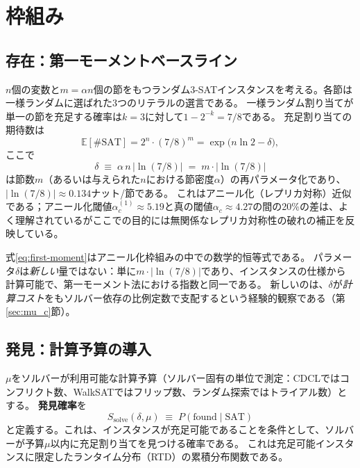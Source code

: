 \documentclass[11pt,a4paper]{article}
\newcommand{\Ssolve}{S_{\text{solve}}}
\newcommand{\PfSAT}{P(\text{found}\mid\text{SAT})}
\begin{document}
\section{枠組み}
\label{sec:framework}

\subsection{存在：第一モーメントベースライン}

$n$個の変数と$m = \alpha n$個の節をもつランダム3-SATインスタンスを考える。各節は一様ランダムに選ばれた3つのリテラルの選言である。
一様ランダム割り当てが単一の節を充足する確率は$k=3$に対して$1 - 2^{-k} = 7/8$である。
充足割り当ての期待数は
\begin{equation}
\label{eq:first-moment}
\mathbb{E}[\#\text{SAT}] = 2^n \cdot (7/8)^m
  = \exp\!\bigl(n\ln 2 - \delta\bigr),
\end{equation}
ここで
\begin{equation}
\label{eq:delta}
\delta \;\equiv\; \alpha\, n\, |\!\ln(7/8)|
  \;=\; m \cdot |\!\ln(7/8)|
\end{equation}
は節数$m$（あるいは与えられた$n$における節密度$\alpha$）の再パラメータ化であり、$|\!\ln(7/8)| \approx 0.134$ナット/節である。
これはアニール化（レプリカ対称）近似である；アニール化閾値$\alpha_c^{(1)} \approx 5.19$と真の閾値$\alpha_c \approx 4.27$\cite{MPZ2009}の間の20\%の差は、よく理解されているがここでの目的には無関係なレプリカ対称性の破れの補正を反映している。

式\eqref{eq:first-moment}はアニール化枠組みの中での数学的恒等式である。
パラメータ$\delta$は\emph{新しい}量ではない：単に$m \cdot |\!\ln(7/8)|$であり、インスタンスの仕様から計算可能で、第一モーメント法における指数と同一である\cite{MPZ2009}。
新しいのは、$\delta$が\emph{計算コスト}をもソルバー依存の比例定数で支配するという経験的観察である（第\ref{sec:mu_c}節）。

\subsection{発見：計算予算の導入}

$\mu$をソルバーが利用可能な計算予算（ソルバー固有の単位で測定：CDCLではコンフリクト数、WalkSATではフリップ数、ランダム探索ではトライアル数）とする。
\textbf{発見確率}を
\begin{equation}
\label{eq:ssolve}
\Ssolve(\delta, \mu) \;\equiv\; \PfSAT
\end{equation}
と定義する。これは、インスタンスが充足可能であることを条件として、ソルバーが予算$\mu$以内に充足割り当てを見つける確率である。
これは充足可能インスタンスに限定したランタイム分布（RTD）\cite{Hoos1999,Frost1997}の累積分布関数である。
\end{document}
